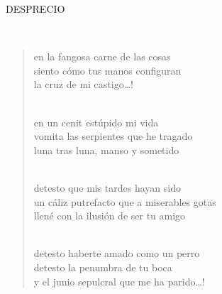 \documentclass[a4paper, 12pt]{article}
\begin{document}
\pagebreak 
    
\centerline{DESPRECIO}
~
\begin{verse}
en la fangosa carne de las cosas\\
siento cómo tus manos configuran\\
la cruz de mi castigo…!\\
~

en un cenit estúpido mi vida\\
vomita las serpientes que he tragado\\
luna tras luna, manso y sometido\\
~

detesto que mis tardes hayan sido\\
un cáliz putrefacto que a miserables gotas\\
llené con la ilusión de ser tu amigo\\
~

detesto haberte amado como un perro\\
detesto la penumbra de tu boca\\
y el junio sepulcral que me ha parido…!\\
\end{verse}

\pagebreak
\end{document}
